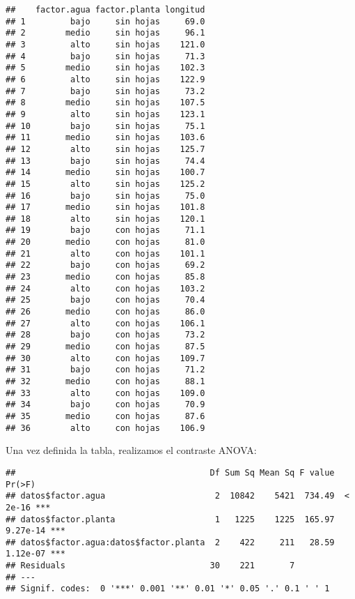 \documentclass[
]{article}
\newenvironment{Shaded}{\begin{snugshade}}{\end{snugshade}}
\newcommand{\FunctionTok}[1]{\textcolor[rgb]{0.00,0.00,0.00}{#1}}
\newcommand{\NormalTok}[1]{#1}
\newcommand{\SpecialCharTok}[1]{\textcolor[rgb]{0.00,0.00,0.00}{#1}}
\begin{document}
\begin{verbatim}
##    factor.agua factor.planta longitud
## 1         bajo     sin hojas     69.0
## 2        medio     sin hojas     96.1
## 3         alto     sin hojas    121.0
## 4         bajo     sin hojas     71.3
## 5        medio     sin hojas    102.3
## 6         alto     sin hojas    122.9
## 7         bajo     sin hojas     73.2
## 8        medio     sin hojas    107.5
## 9         alto     sin hojas    123.1
## 10        bajo     sin hojas     75.1
## 11       medio     sin hojas    103.6
## 12        alto     sin hojas    125.7
## 13        bajo     sin hojas     74.4
## 14       medio     sin hojas    100.7
## 15        alto     sin hojas    125.2
## 16        bajo     sin hojas     75.0
## 17       medio     sin hojas    101.8
## 18        alto     sin hojas    120.1
## 19        bajo     con hojas     71.1
## 20       medio     con hojas     81.0
## 21        alto     con hojas    101.1
## 22        bajo     con hojas     69.2
## 23       medio     con hojas     85.8
## 24        alto     con hojas    103.2
## 25        bajo     con hojas     70.4
## 26       medio     con hojas     86.0
## 27        alto     con hojas    106.1
## 28        bajo     con hojas     73.2
## 29       medio     con hojas     87.5
## 30        alto     con hojas    109.7
## 31        bajo     con hojas     71.2
## 32       medio     con hojas     88.1
## 33        alto     con hojas    109.0
## 34        bajo     con hojas     70.9
## 35       medio     con hojas     87.6
## 36        alto     con hojas    106.9
\end{verbatim}

Una vez definida la tabla, realizamos el contraste ANOVA:

\begin{Shaded}
\end{Shaded}

\begin{verbatim}
##                                       Df Sum Sq Mean Sq F value   Pr(>F)    
## datos$factor.agua                      2  10842    5421  734.49  < 2e-16 ***
## datos$factor.planta                    1   1225    1225  165.97 9.27e-14 ***
## datos$factor.agua:datos$factor.planta  2    422     211   28.59 1.12e-07 ***
## Residuals                             30    221       7                     
## ---
## Signif. codes:  0 '***' 0.001 '**' 0.01 '*' 0.05 '.' 0.1 ' ' 1
\end{verbatim}
\end{document}
